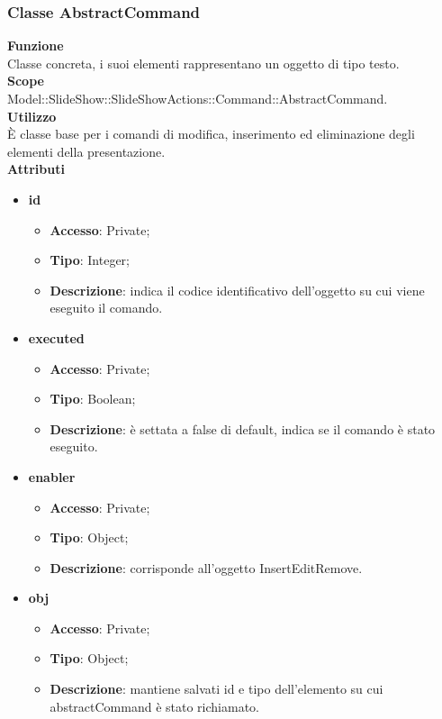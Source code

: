 {{	\subsubsection{Classe AbstractCommand}{
		\textbf{Funzione}\\
			\indent Classe concreta, i suoi elementi rappresentano un oggetto di tipo testo.\\
	   	\textbf{Scope}\\
			\indent Model::SlideShow::SlideShowActions::Command::AbstractCommand.\\
		\textbf{Utilizzo}\\
			\indent È classe base per i comandi di modifica, inserimento ed eliminazione degli elementi della presentazione.\\
		\textbf{Attributi}
		\begin{itemize}
			\item \textbf{id}
			\begin{itemize}
				\item \textbf{Accesso}: Private;
				\item \textbf{Tipo}: Integer;
				\item \textbf{Descrizione}: indica il codice identificativo dell’oggetto su cui viene eseguito il comando.
			\end{itemize}
			\item \textbf{executed}
			\begin{itemize}
				\item \textbf{Accesso}: Private;
				\item \textbf{Tipo}: Boolean;
				\item \textbf{Descrizione}: è settata a false di default, indica se il comando è stato eseguito.
			\end{itemize}
			\item \textbf{enabler}
			\begin{itemize}
				\item \textbf{Accesso}: Private;
				\item \textbf{Tipo}: Object;
				\item \textbf{Descrizione}: corrisponde all'oggetto InsertEditRemove.
			\end{itemize}
			\item \textbf{obj}
			\begin{itemize}
				\item \textbf{Accesso}: Private;
				\item \textbf{Tipo}: Object;
				\item \textbf{Descrizione}: mantiene salvati id e tipo dell'elemento su cui abstractCommand è stato richiamato.
			\end{itemize}
		\end{itemize}
		
}}}
